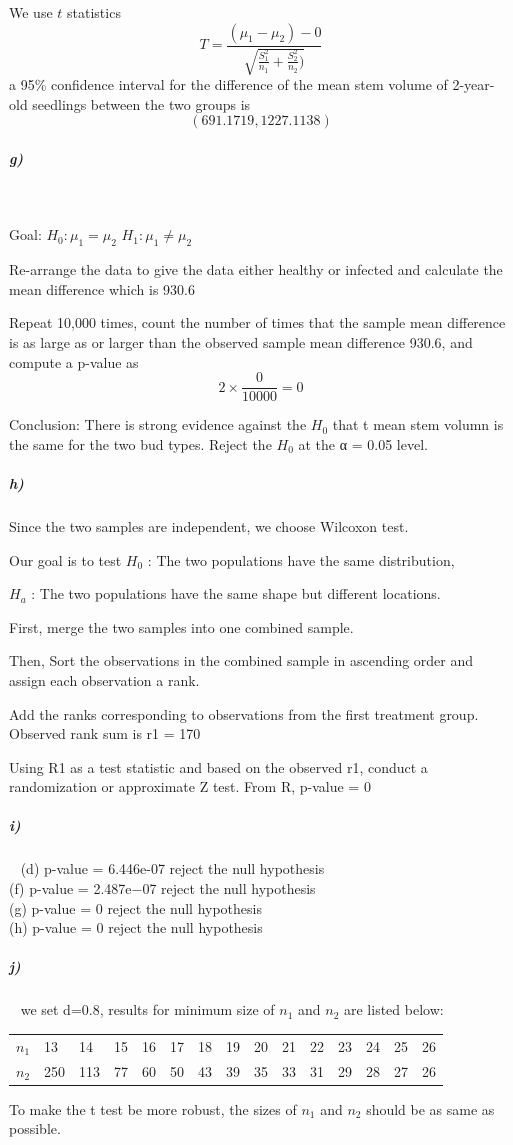 \documentclass{article}
\begin{document}
We use $t$ statistics \[T=\frac{(\mu_1-\mu_2)-0}{\sqrt{\frac{S_1^2}{n_1}+\frac{S_2^2}{n_2})}}\]
a 95\% conﬁdence interval for the diﬀerence of the mean stem volume of 2-year-old seedlings between the two groups is\[(691.1719 , 1227.1138)\]
\subparagraph{g)}~{}

Goal: $H_0 : \mu_1 = \mu_2$ $H_1 : \mu_1 \neq \mu_2$

Re-arrange the data to give the data either healthy or infected and calculate the mean difference which is  930.6

Repeat 10,000 times, count the number of times that the sample mean difference is as large as or larger than the observed sample mean difference  930.6, and compute a p-value as \[2 \times \frac{0}{10000} = 0\]

Conclusion: There is strong evidence against the $H_0$ that t mean stem volumn is the same for the two bud types. Reject the $H_0$ at the α = 0.05 level. 
\subparagraph{h)}
Since the two samples are independent, we choose Wilcoxon test.

Our goal is to test
$H_0$ : The two populations have the same distribution, 

$H_a$ : The two populations have the same shape but different locations.

First, merge the two samples into one combined sample. 

Then, Sort the observations in the combined sample in ascending order and assign each observation a rank. 

Add the ranks corresponding to observations from the ﬁrst treatment group. Observed rank sum is r1 = 170

 Using R1 as a test statistic and based on the observed r1, conduct a randomization or approximate Z test. From R, p-value = 0
\subparagraph{i)}~{}
\newline
(d) p-value = 6.446e-07 reject the null hypothesis\\
(f) p-value = 2.487e−07  reject the null hypothesis\\
(g) p-value = 0 reject the null hypothesis\\
(h) p-value = 0 reject the null hypothesis
\subparagraph{j)}~{}
we set d=0.8, results for minimum size of $n_1$ and $n_2$ are listed below:
\begin{table}[]
\begin{tabular}{lllllllllllllll}
$n_1$ & 13  & 14  & 15 & 16 & 17 & 18 & 19 & 20 & 21 & 22 & 23 & 24 & 25 & 26 \\
$n_2$ & 250 & 113 & 77 & 60 & 50 & 43 & 39 & 35 & 33 & 31 & 29 & 28 & 27 & 26
\end{tabular}
\end{table}
To make the t test be more robust, the sizes of $n_1$ and $n_2$ should be as same as possible. 
\end{document}
